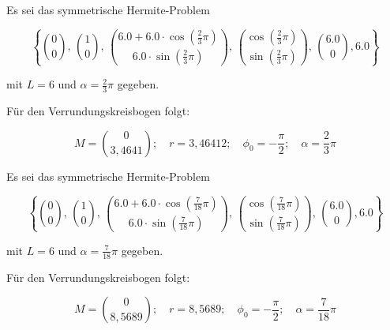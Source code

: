 \BEISPIEL
{
Es sei das symmetrische Hermite-Problem 

   $$\left\{\binom{0}{0},\, \binom{1}{0},\,
\binom{6.0+6.0\cdot \cos\left(\frac{2}{3}\pi\right)}{6.0\cdot \sin\left(\frac{2}{3}\pi\right)},\, \binom{\cos\left(\frac{2}{3}\pi\right)}{\sin\left(\frac{2}{3}\pi\right)},\, \binom{6.0}{0},6.0\right\}$$

mit $L=6$ und $\alpha=\frac{2}{3}\pi$ gegeben.

Für den Verrundungskreisbogen folgt:

$$M=\binom{0}{3,4641}; \quad r=3,46412;\quad \phi_0 = -\frac{\pi}{2}; \quad \alpha=\frac{2}{3}\pi$$


\begin{center}
\end{center}
}


\BEISPIEL
{
  Es sei das symmetrische Hermite-Problem 
  
  $$\left\{\binom{0}{0},\, \binom{1}{0},\,
  \binom{6.0+6.0\cdot \cos\left(\frac{7}{18}\pi\right)}{6.0\cdot \sin\left(\frac{7}{18}\pi\right)},\, \binom{\cos\left(\frac{7}{18}\pi\right)}{\sin\left(\frac{7}{18}\pi\right)},\, \binom{6.0}{0},6.0\right\}$$
  
  mit $L=6$ und $\alpha=\frac{7}{18}\pi$ gegeben.
  
  Für den Verrundungskreisbogen folgt:
  
  $$M=\binom{0}{8,5689}; \quad r=8,5689;\quad \phi_0 = -\frac{\pi}{2}; \quad \alpha=\frac{7}{18}\pi$$
  
  
  \begin{center}
  \end{center}
}



